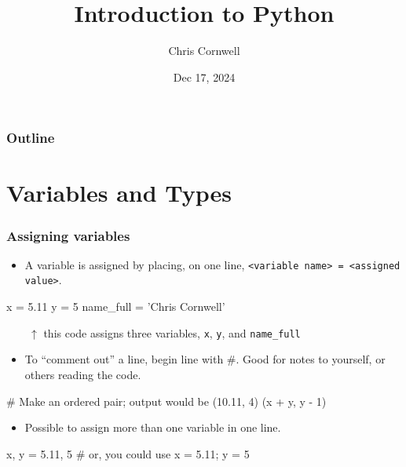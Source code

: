 \documentclass{beamer}
\author{Chris Cornwell}
\date{Dec 17, 2024}
\title{Introduction to Python}
\newenvironment{codeblock}
    {\hfill\begin{beamerboxesrounded}[lower=codecol, width=0.8\textwidth]
    \medskip

    }
    { 
    \end{beamerboxesrounded}\hfill
    }
\theoremstyle{example}
\newcommand{\ct}[1]{\lstinline[language=Python]!#1!}
\newcommand{\ttt}[1]{{\small\texttt{#1}}}
\begin{document}
\begin{frame}
\titlepage
\end{frame}

\begin{frame}
\frametitle{Outline}
\tableofcontents
\end{frame}

\section{Variables and Types}

\begin{frame}[fragile]
\frametitle{Assigning variables}

\begin{itemize}
	\item A variable is assigned by placing, on one line, \mbox{\ttt{<variable name> = <assigned value>}.}
\end{itemize}
\begin{codeblock}

\begin{python}
x = 5.11
y = 5
name_full = 'Chris Cornwell'
\end{python}

\end{codeblock}

$\qquad\uparrow$ this code assigns three variables, \ttt{x}, \ttt{y}, and \ttt{name}\ct{_}\ttt{full}

\begin{itemize}
	\item To ``comment out'' a line, begin line with \#. Good for notes to yourself, or others reading the code.
\end{itemize}

\begin{codeblock}

\begin{python}
# Make an ordered pair; output would be (10.11, 4)
(x + y, y - 1)
\end{python}

\end{codeblock}

\begin{itemize}
	\item Possible to assign more than one variable in one line.
\end{itemize}

\begin{codeblock}

\begin{python}
x, y = 5.11, 5
# or, you could use 
x = 5.11; y = 5
\end{python}

\end{codeblock}
\end{frame}
\end{document}
